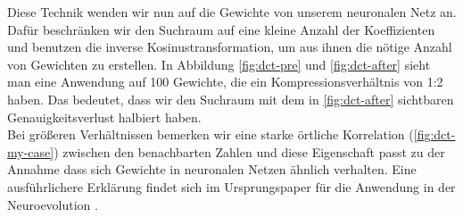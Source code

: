             Diese Technik wenden wir nun auf die Gewichte von unserem neuronalen Netz an. Dafür beschränken wir den Suchraum auf eine kleine Anzahl der Koeffizienten und benutzen die inverse Kosinustransformation, um aus ihnen die nötige Anzahl von Gewichten zu erstellen. In Abbildung \ref{fig:dct-pre} und \ref{fig:dct-after} sieht man eine Anwendung auf 100 Gewichte, die ein Kompressionsverhältnis von 1:2 haben. Das bedeutet, dass wir den Suchraum mit dem in \ref{fig:dct-after} sichtbaren Genauigkeitsverlust halbiert haben.\\

            \noindent
            Bei größeren Verhältnissen bemerken wir eine starke örtliche Korrelation (\ref{fig:dct-my-case}) zwischen den benachbarten Zahlen und diese Eigenschaft passt zu der Annahme dass sich Gewichte in neuronalen Netzen ähnlich verhalten. Eine ausführlichere Erklärung findet sich im Ursprungspaper für die Anwendung in der Neuroevolution \cite{cosyne1}.

